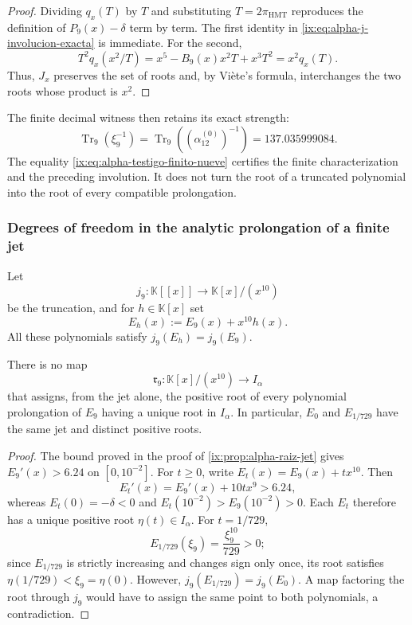 \begin{proof}
Dividing \(q_x(T)\) by \(T\) and substituting
\(T=2\pi_{\mathrm{HMT}}\) reproduces the definition of \(P_9(x)-\delta\)
term by term. The first identity in
\eqref{ix:eq:alpha-j-involucion-exacta} is immediate. For the second,
\[
 T^2q_x(x^2/T)
 =x^5-B_9(x)x^2T+x^3T^2=x^2q_x(T).
\]
Thus, \(J_x\) preserves the set of roots and, by Viète’s formula,
interchanges the two roots whose product is \(x^2\).
\end{proof}

The finite decimal witness then retains its exact strength:
\begin{equation}
 \operatorname{Tr}_9(\xi_9^{-1})
 =\operatorname{Tr}_9\!\left((\alpha_{12}^{(0)})^{-1}\right)
 =137.035999084.
 \label{ix:eq:alpha-testigo-finito-nueve}
\end{equation}
The equality \eqref{ix:eq:alpha-testigo-finito-nueve} certifies the
finite characterization and the preceding involution. It does not turn the root of
a truncated polynomial into the root of every compatible prolongation.

\subsubsection{Degrees of freedom in the analytic prolongation of a finite jet}

Let
\[
 j_9:\mathbb K[[x]]\longrightarrow \mathbb K[x]/(x^{10})
\]
be the truncation, and for \(h\in\mathbb K[x]\) set
\begin{equation}
 E_h(x):=E_9(x)+x^{10}h(x).
 \label{ix:eq:alpha-familia-prolongaciones-mismo-jet}
\end{equation}
All these polynomials satisfy \(j_9(E_h)=j_9(E_9)\).

\begin{theorem}
\label{ix:thm:alpha-no-unicidad-prolongacion-jet}
There is no map
\[
 \mathfrak r_9:\mathbb K[x]/(x^{10})\longrightarrow I_\alpha
\]
that assigns, from the jet alone, the positive root of every
polynomial prolongation of \(E_9\) having a unique root in
\(I_\alpha\). In particular, \(E_0\) and \(E_{1/729}\) have the same jet and
distinct positive roots.
\end{theorem}

\begin{proof}
The bound proved in the proof of
\ref{ix:prop:alpha-raiz-jet} gives \(E_9'(x)>6.24\) on
\([0,10^{-2}]\). For \(t\geq0\), write
\(E_t(x)=E_9(x)+tx^{10}\). Then
\[
 E_t'(x)=E_9'(x)+10tx^9>6.24,
\]
whereas \(E_t(0)=-\delta<0\) and
\(E_t(10^{-2})>E_9(10^{-2})>0\). Each \(E_t\) therefore has a unique
positive root \(\eta(t)\in I_\alpha\). For \(t=1/729\),
\[
 E_{1/729}(\xi_9)=\frac{\xi_9^{10}}{729}>0;
\]
since \(E_{1/729}\) is strictly increasing and changes sign only
once, its root satisfies \(\eta(1/729)<\xi_9=\eta(0)\). However,
\(j_9(E_{1/729})=j_9(E_0)\). A map factoring the root through
\(j_9\) would have to assign the same point to both polynomials, a contradiction.
\end{proof}

